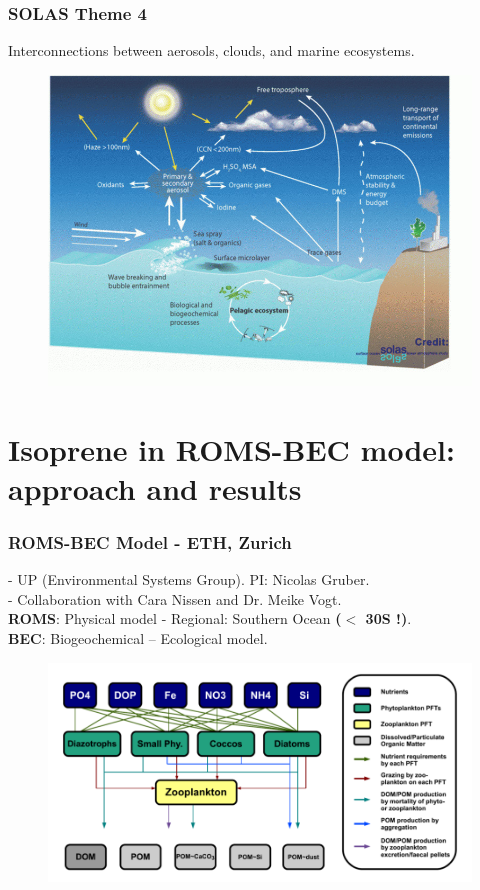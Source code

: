 \documentclass{beamer}
\begin{document}

\begin{frame}
\frametitle{SOLAS Theme 4}
Interconnections between aerosols, clouds, and marine ecosystems.
\begin{figure}
\includegraphics[width=0.8\linewidth]{theme4.jpg}
\end{figure}
\end{frame}


\section{Isoprene in ROMS-BEC model: approach and results}

\begin{frame}
\frametitle{ROMS-BEC Model - ETH, Zurich}
- UP (Environmental Systems Group). PI: Nicolas Gruber.\\
- Collaboration with Cara Nissen and Dr. Meike Vogt.\\
\bigskip
\textbf{ROMS}: Physical model - Regional: Southern Ocean \textbf{($<$ 30S !)}.\\
\textbf{BEC}: Biogeochemical -- Ecological model.
\begin{figure}
\includegraphics[width=0.9\linewidth]{Screenshot_from_2016-11-16_18_37_12.png}
\end{figure}

\end{frame}
\end{document}
